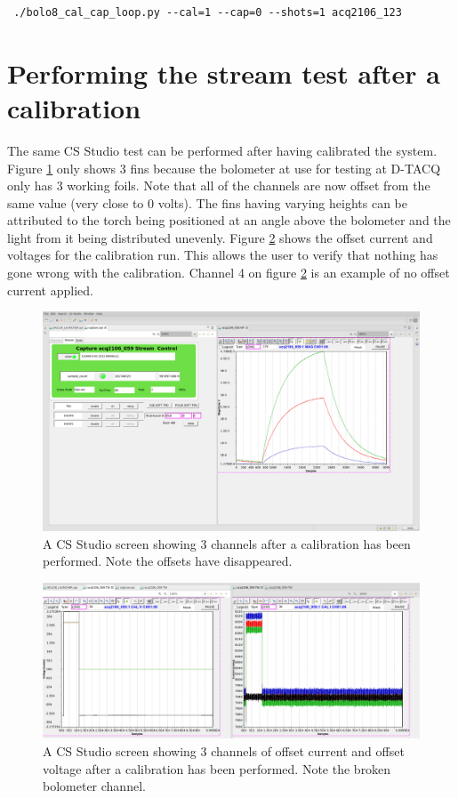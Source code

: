 \documentclass{article}
\begin{document}
\begin{verbatim} ./bolo8_cal_cap_loop.py --cal=1 --cap=0 --shots=1 acq2106_123\end{verbatim}




\section{Performing the stream test after a calibration}
The same CS Studio test can be performed after having calibrated the system.
Figure \ref{3fincal} only shows 3 fins because the bolometer at use for testing at D-TACQ only has 3 working foils.
Note that all of the channels are now offset from the same value (very close to 0 volts).
The fins having varying heights can be attributed to the torch being positioned at an angle above the bolometer and the light from it being distributed unevenly.
Figure \ref{currentvoltage} shows the offset current and voltages for the calibration run.
This allows the user to verify that nothing has gone wrong with the calibration.
Channel 4 on figure \ref{currentvoltage} is an example of no offset current applied.

\begin{figure} [hbt!]
	\centering
	\includegraphics[width=5.0in]{images/3-fin-cal.png}
	\caption{A CS Studio screen showing 3 channels after a calibration has been performed. Note the offsets have disappeared.}
	\label{3fincal}
\end{figure}

\begin{figure} [hbt!]
	\centering
	\includegraphics[width=5.0in]{images/bolo-css-current-volts.png}
	\caption{A CS Studio screen showing 3 channels of offset current and offset voltage after a calibration has been performed. Note the broken bolometer channel.}
	\label{currentvoltage}
\end{figure}
\end{document}
